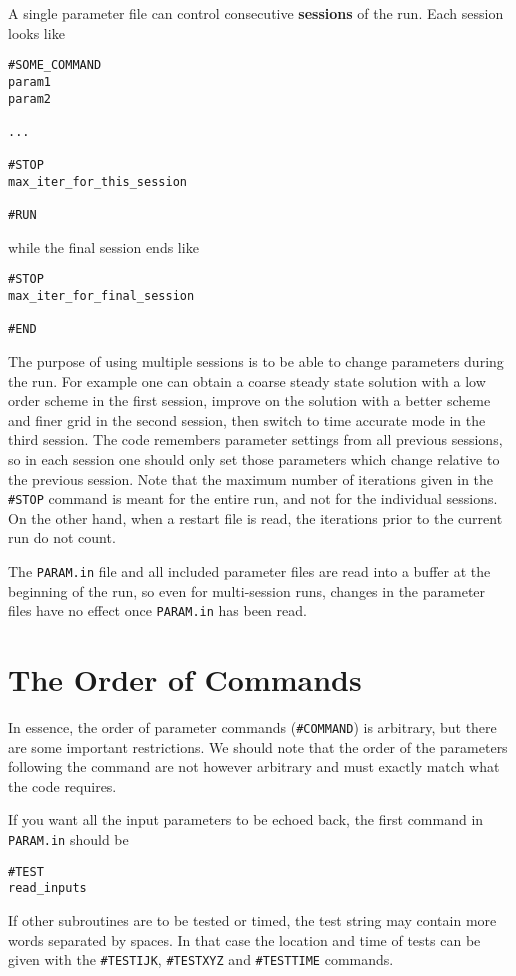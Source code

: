 A single parameter file can control consecutive {\bf sessions}
of the run. Each session looks like
\begin{verbatim}
#SOME_COMMAND
param1
param2

...

#STOP
max_iter_for_this_session

#RUN
\end{verbatim}
while the final session ends like
\begin{verbatim}
#STOP
max_iter_for_final_session

#END
\end{verbatim}
The purpose of using multiple sessions is to be able to change parameters 
during the run. For example one can obtain a coarse steady state solution
with a low order scheme in the first session, improve on the solution
with a better scheme and finer grid in the second session, then switch
to time accurate mode in the third session. The code remembers parameter
settings from all previous sessions, so in each session one should only
set those parameters which change relative to the previous session.
Note that the maximum number of iterations given in the {\tt \#STOP} command 
is meant for the entire run, and not for the individual sessions. 
On the other hand, when a restart file is read, the iterations prior to 
the current run do not count.

The {\tt PARAM.in} file and all included parameter files are read into a buffer 
at the beginning of the run, so even for multi-session runs, changes in
the parameter files have no effect once {\tt PARAM.in} has been read.

\section{The Order of Commands \label{section:order}}

In essence, the order of parameter commands ({\tt \#COMMAND}) is arbitrary, 
but there are some important restrictions.  We should note that the 
order of the parameters following the command are not however arbitrary and must
exactly match what the code requires.  

If you want all the input parameters to be echoed back, the first
command in {\tt PARAM.in} should be
\begin{verbatim}
#TEST
read_inputs
\end{verbatim}
If other subroutines are to be tested or timed, the test string
may contain more words separated by spaces. In that case the
location and time of tests can be given with the {\tt \#TESTIJK},
{\tt \#TESTXYZ} and {\tt \#TESTTIME} commands.

